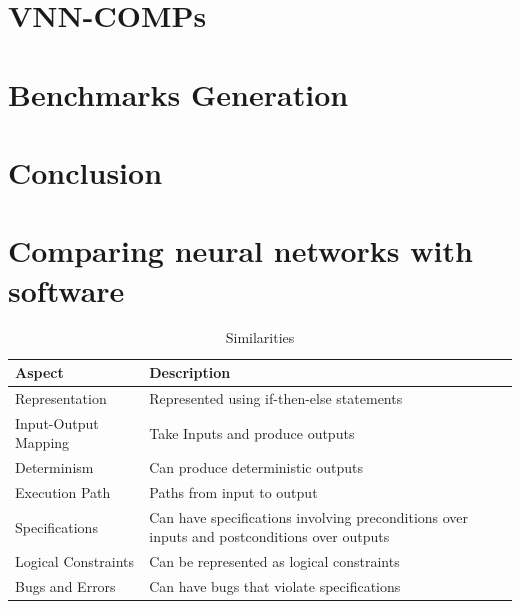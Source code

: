 \documentclass[oneside,11pt,dvipsnames]{book}
\numberwithin{equation}{section}
\theoremstyle{definition}
\theoremstyle{remark}
\begin{document}
\chapter{VNN-COMPs}\label{chap:vnncomps}

\chapter{Benchmarks Generation}\label{chap:benchmarks-generation}




\chapter{Conclusion}

\appendix

\chapter{Comparing neural networks with software}\label{app:nn-vs-software}

\begin{table}
    \caption{Similarities}\label{tab:nn-software-similarities}
    \scriptsize
    \centering
\begin{tabular}{l|l}
    \toprule
    Aspect & Description\\
    \midrule
    Representation &	Represented using if-then-else statements\\
    Input-Output Mapping &	Take Inputs and produce outputs\\
    Determinism	& Can produce deterministic outputs\\
    Execution Path	& Paths from input to output\\
    Specifications & Can have specifications involving preconditions over inputs and postconditions over outputs\\
    Logical Constraints	& Can be represented as logical constraints\\
    Bugs and Errors & Can have bugs that violate specifications\\
    \bottomrule
\end{tabular}    
\end{table}
\end{document}
